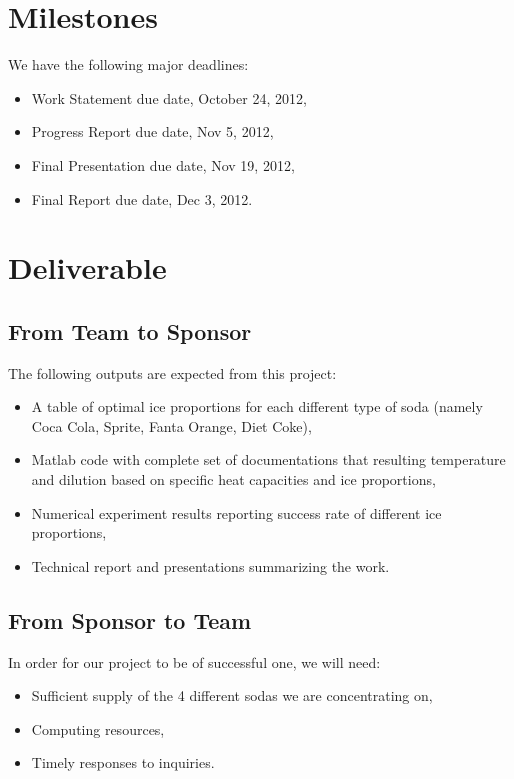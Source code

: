 \documentclass[12pt,letterpaper]{article}
\theoremstyle{definition}
\begin{document}
\section{Milestones}
We have the following major deadlines:
\begin{itemize}
    \item Work Statement due date, October 24, 2012,
    \item Progress Report due date, Nov 5, 2012,
    \item Final Presentation due date, Nov 19, 2012,
    \item Final Report due date, Dec 3, 2012.
\end{itemize}

\section{Deliverable}
\subsection{From Team to Sponsor} %
The following outputs are expected from this project:
\begin{itemize}
    \item A table of optimal ice proportions for each different type of soda (namely Coca Cola, Sprite, Fanta Orange, Diet Coke),
    \item Matlab code with complete set of documentations that resulting temperature and dilution based on specific heat capacities and ice proportions,
    \item Numerical experiment results reporting success rate of different ice proportions,
    \item Technical report and presentations summarizing the work. 
\end{itemize}

\subsection{From Sponsor to Team} %

In order for our project to be of successful one, we will need:
\begin{itemize}
    \item Sufficient supply of the 4 different sodas we are concentrating on,
    \item Computing resources,
    \item Timely responses to inquiries.
\end{itemize}

%
%
\end{document}

